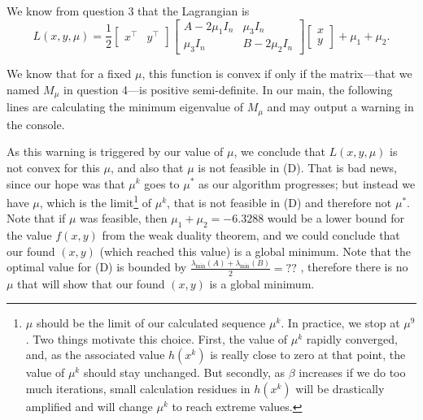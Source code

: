 \documentclass{article}
\newcommand{\tp}{^\top}
\begin{document}
We know from question 3 that the Lagrangian is\\
$$ L(x, y, \mu) = \dfrac{1}{2}
\begin{bmatrix} x\tp & y\tp\end{bmatrix}
\begin{bmatrix} A-2\mu_1 I_n & \mu_3 I_n \\
\mu_3 I_n & B-2\mu_2 I_n \end{bmatrix}
\begin{bmatrix} x \\ y \end{bmatrix}
+ \mu_1 + \mu_2. $$

We know that for a fixed $\mu$, this function is convex if only if the matrix---that we named $M_\mu$ in question 4---is positive semi-definite.
In our main, the following lines are calculating the minimum eigenvalue of $M_\mu$ and may output a warning in the console.



As this warning is triggered by our value of $\mu$, we conclude that $L(x, y, \mu)$ is not convex for this $\mu$, and also that $\mu$ is not feasible in (D). That is bad news, since our hope was that $\mu^k$ goes to $\mu^*$ as our algorithm progresses; but instead we have $\mu$, which is the limit\footnote{$\mu$ should be the limit of our calculated sequence $\mu^k$. In practice, we stop at $\mu^9$. Two things motivate this choice. First, the value of $\mu^k$ rapidly converged, and, as the associated value $h(x^k)$ is really close to zero at that point, the value of $\mu^k$ should stay unchanged. But secondly, as $\beta$ increases if we do too much iterations, small calculation residues in $h(x^k)$ will be drastically amplified and will change $\mu^k$ to reach extreme values.}
of $\mu^k$, that is not feasible in (D) and therefore not $\mu^*$. Note that if $\mu$ was feasible, then $\mu_1 + \mu_2 = -6.3288$ would be a lower bound for the value $f(x, y)$ from the weak duality theorem, and we could conclude that our found $(x, y)$ (which reached this value) is a global minimum.
Note that the optimal value for (D) is bounded by $\frac{\lambda_{\min}(A) + \lambda_{\min}(B)}{2} = ??$ , therefore there is no $\mu$ that will show that our found $(x, y)$ is a global minimum. %
\end{document}
